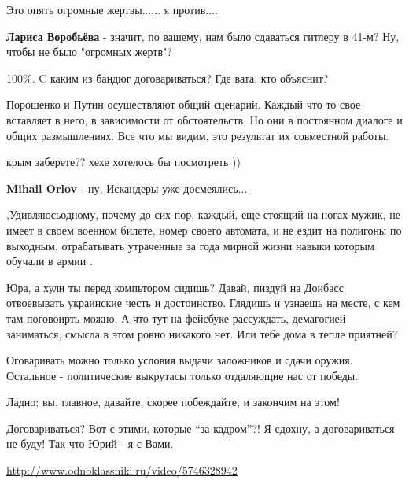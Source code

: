 \begin{itemize}
Это опять огромные жертвы...... я против....

\textbf{Лариса Воробьёва} - значит, по вашему, нам было сдаваться гитлеру в 41-м? Ну, чтобы не было "огромных жертв"?

100\%. C каким из бандюг договариваться? Где вата, кто объяснит?


Порошенко и Путин осуществляют общий сценарий. Каждый что то свое вставляет в
него, в зависимости от обстоятельств. Но они в постоянном диалоге и общих
размышлениях. Все что мы видим, это результат их совместной работы.


крым заберете?? хехе хотелось бы посмотреть ))

\textbf{Mihail Orlov} - ну, Искандеры уже досмеялись...


,Удивляюсьодному, почему до сих пор, каждый, еще стоящий на ногах мужик, не
имеет в своем военном билете, номер своего автомата, и не ездит на полигоны по
выходным, отрабатывать утраченные за года мирной жизни навыки которым обучали в
армии .


Юра, а хули ты перед компьтором сидишь? Давай, пиздуй на Донбасс отвоевывать
украинские честь и достоинство. Глядишь и узнаешь на месте, с кем там
поговоирть можно. А что тут на фейсбуке рассуждать, демагогией заниматься,
смысла в этом ровно никакого нет. Или тебе дома в тепле приятней?


Оговаривать можно только условия выдачи заложников и сдачи оружия. Остальное -
политические выкрутасы только отдаляющие нас от победы.


Ладно; вы, главное, давайте, скорее побеждайте, и закончим на этом!


Договариваться? Вот с этими, которые \enquote{за кадром}?! Я сдохну, а договариваться
не буду! Так что Юрий - я с Вами.

\url{http://www.odnoklassniki.ru/video/5746328942}

\end{itemize} %

